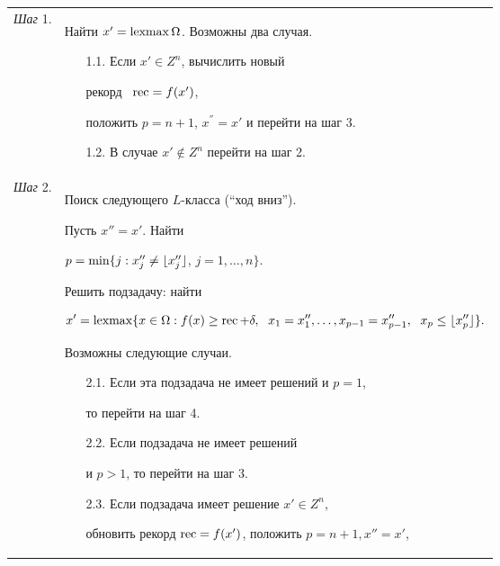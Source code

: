 \begin{tabular}{p{14mm}p{145mm}}


{\it Шаг} 1. & Найти $x' = \operatorname{lexmax} \Omega$. Возможны два случая.


\begin{itemize}


\item[1.1.] Если $x' \in Z^{n}$, вычислить новый 


рекорд \ $\operatorname{rec} = f(x')$,


положить $p = n + 1$, $x^{''} = x'$  и перейти на шаг 3.


\item[1.2.] В случае $x' \notin Z^{n}$ перейти на шаг 2.


\end{itemize}


\\





{\it Шаг} 2. & Поиск следующего $L$-класса (``ход вниз'').


Пусть $x'' = x'.$ Найти


$p=\min\{j :\linebreak x''_j \neq \lfloor x''_j \rfloor$,  $j=1,\dotsc,n\}.$


Решить подзадачу: найти


$$


x' = \lexmax \{ x \in \Omega : f(x) \geq \rec + \delta,


\ \; x_1 =x''_1,\dotsc,x_{p-1}= x''_{p-1},\ \;  x_p \leq \lfloor


x''_p\rfloor\}.


$$





\noindent{}Возможны следующие случаи.


\begin{itemize}


\item[2.1.] Если эта подзадача не имеет решений и $p = 1$,


то  перейти на шаг 4.


\item[2.2.] Если подзадача не имеет решений


и $p>1$, то перейти на шаг 3.


\item[2.3.] Если подзадача имеет решение $x' \in  Z^n$, 


обновить рекорд $\operatorname{rec} = f(x')$, положить $p = n+1, x''= x'$,



\end{itemize}
\end{tabular}
